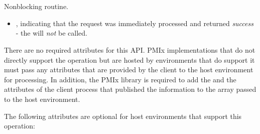 \section{}

\summary

Nonblocking  routine.

\format


\begin{arglist}
\end{arglist}

\returnsimplenb

\returnstart
\begin{itemize}
    \item {}, indicating that the request was immediately processed and returned \textit{success} - the  will \textit{not} be called.
\end{itemize}
\returnend

\reqattrstart
There are no required attributes for this \ac{API}. \ac{PMIx} implementations that do not directly support the operation but are hosted by environments that do support it must pass any attributes that are provided by the client to the host environment for processing. In addition, the \ac{PMIx} library is required to add the  and the  attributes of the client process that published the information to the  array passed to the host environment.

\reqattrend

\optattrstart
The following attributes are optional for host environments that support this operation:


